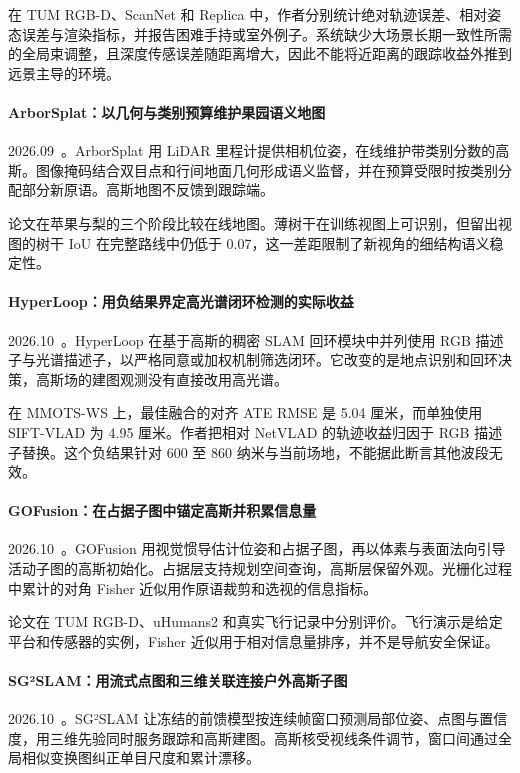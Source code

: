 在 TUM RGB-D、ScanNet 和 Replica 中，作者分别统计绝对轨迹误差、相对姿态误差与渲染指标，并报告困难手持或室外例子。系统缺少大场景长期一致性所需的全局束调整，且深度传感误差随距离增大，因此不能将近距离的跟踪收益外推到远景主导的环境。

\paragraph{ArborSplat：以几何与类别预算维护果园语义地图}
2026.09~\cite{2609_26315}。ArborSplat 用 LiDAR 里程计提供相机位姿，在线维护带类别分数的高斯。图像掩码结合双目点和行间地面几何形成语义监督，并在预算受限时按类别分配部分新原语。高斯地图不反馈到跟踪端。

论文在苹果与梨的三个阶段比较在线地图。薄树干在训练视图上可识别，但留出视图的树干 IoU 在完整路线中仍低于 0.07，这一差距限制了新视角的细结构语义稳定性。

\paragraph{HyperLoop：用负结果界定高光谱闭环检测的实际收益}
2026.10~\cite{2610_19742}。HyperLoop 在基于高斯的稠密 SLAM 回环模块中并列使用 RGB 描述子与光谱描述子，以严格同意或加权机制筛选闭环。它改变的是地点识别和回环决策，高斯场的建图观测没有直接改用高光谱。

在 MMOTS-WS 上，最佳融合的对齐 ATE RMSE 是 5.04 厘米，而单独使用 SIFT-VLAD 为 4.95 厘米。作者把相对 NetVLAD 的轨迹收益归因于 RGB 描述子替换。这个负结果针对 600 至 860 纳米与当前场地，不能据此断言其他波段无效。

\paragraph{GOFusion：在占据子图中锚定高斯并积累信息量}
2026.10~\cite{2610_25261}。GOFusion 用视觉惯导估计位姿和占据子图，再以体素与表面法向引导活动子图的高斯初始化。占据层支持规划空间查询，高斯层保留外观。光栅化过程中累计的对角 Fisher 近似用作原语裁剪和选视的信息指标。

论文在 TUM RGB-D、uHumans2 和真实飞行记录中分别评价。飞行演示是给定平台和传感器的实例，Fisher 近似用于相对信息量排序，并不是导航安全保证。

\paragraph{SG²SLAM：用流式点图和三维关联连接户外高斯子图}
2026.10~\cite{2610_36312}。SG²SLAM 让冻结的前馈模型按连续帧窗口预测局部位姿、点图与置信度，用三维先验同时服务跟踪和高斯建图。高斯核受视线条件调节，窗口间通过全局相似变换图纠正单目尺度和累计漂移。

